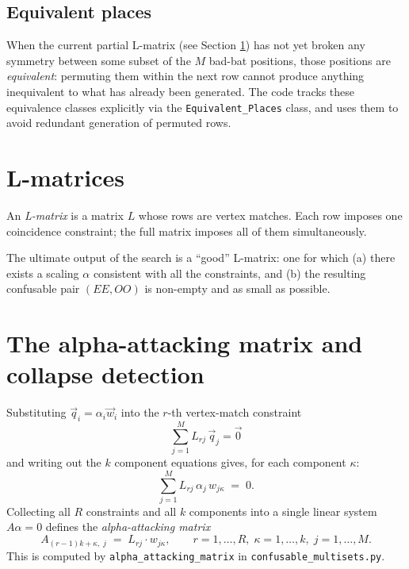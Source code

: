 \documentclass[12pt,a4paper]{article}
\begin{document}
\subsection*{Equivalent places}

When the current partial L-matrix (see Section \ref{sec:L-matrices}) has not
yet broken any symmetry between some subset of the $M$ bad-bat positions, those
positions are \emph{equivalent}: permuting them within the next row cannot
produce anything inequivalent to what has already been generated. The code
tracks these equivalence classes explicitly via the \texttt{Equivalent\_Places}
class, and uses them to avoid redundant generation of permuted rows.

\section{L-matrices}
\label{sec:L-matrices}

An \emph{L-matrix} is a matrix $L$ whose rows are vertex matches. Each row
imposes one coincidence constraint; the full matrix imposes all of them
simultaneously.

The ultimate output of the search is a ``good'' L-matrix: one for which (a)
there exists a scaling $\alpha$ consistent with all the constraints, and (b)
the resulting confusable pair $(EE, OO)$ is non-empty and as small as possible.

\section{The alpha-attacking matrix and collapse detection}
\label{sec:alpha-attacking}

Substituting $\vec{q}_i = \alpha_i \vec{w}_i$ into the $r$-th vertex-match
constraint
\[
  \sum_{j=1}^M L_{rj}\, \vec{q}_j = \vec{0}
\]
and writing out the $k$ component equations gives, for each component $\kappa$:
\[
  \sum_{j=1}^M L_{rj} \,\alpha_j \, w_{j\kappa} \;=\; 0.
\]
Collecting all $R$ constraints and all $k$ components into a single linear
system $A \alpha = 0$ defines the \emph{alpha-attacking matrix}
\[
  A_{(r-1)k+\kappa,\; j} \;=\; L_{rj} \cdot w_{j\kappa},
  \qquad r=1,\ldots,R,\; \kappa=1,\ldots,k,\; j=1,\ldots,M.
\]
This is computed by \texttt{alpha\_attacking\_matrix} in
\texttt{confusable\_multisets.py}.
\end{document}

